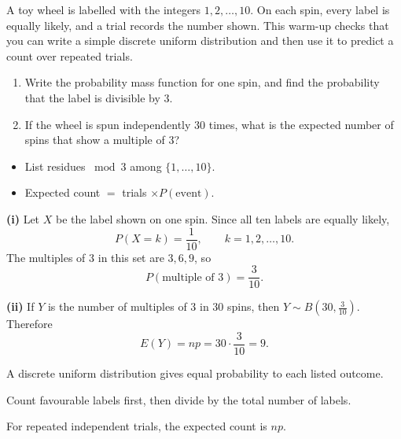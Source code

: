 
\begin{problem}
A toy wheel is labelled with the integers $1,2,\ldots,10$. On each spin, every label is equally likely, and a trial records the number shown. This warm-up checks that you can write a simple discrete uniform distribution and then use it to predict a count over repeated trials.
\begin{enumerate}[label=\textbf{(\roman*)}]
\item Write the probability mass function for one spin, and find the probability that the label is divisible by $3$.
\item If the wheel is spun independently $30$ times, what is the expected number of spins that show a multiple of $3$?
\end{enumerate}
\end{problem}

\begin{hint}
\begin{itemize}[leftmargin=*]
\item List residues $\bmod 3$ among $\{1,\ldots,10\}$.
\item Expected count $=$ trials $\times P(\text{event})$.
\end{itemize}
\end{hint}

\begin{solution}
\textbf{(i)} Let $X$ be the label shown on one spin. Since all ten labels are equally likely,
\[
P(X=k)=\frac{1}{10},\qquad k=1,2,\ldots,10.
\]
The multiples of $3$ in this set are $3,6,9$, so
\[
P(\text{multiple of }3)=\frac{3}{10}.
\]

\textbf{(ii)} If $Y$ is the number of multiples of $3$ in $30$ spins, then $Y\sim B(30,\frac{3}{10})$. Therefore
\[
E(Y)=np=30\cdot\frac{3}{10}=\boxed{9}.
\]
\end{solution}

\begin{takeaways}
\item A discrete uniform distribution gives equal probability to each listed outcome.
\item Count favourable labels first, then divide by the total number of labels.
\item For repeated independent trials, the expected count is $np$.
\end{takeaways}
